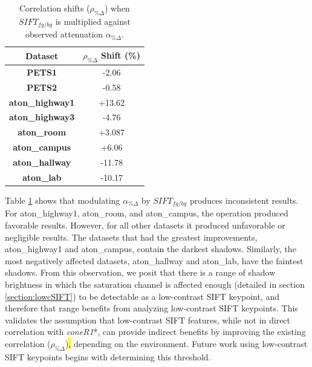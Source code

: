 \begin{table}
\centering
\begin{tabular}{ |c|c| }
	\hline
	\textbf{Dataset} & $\rho_{\%\Delta}$ Shift (\%)\\
	\hline
	\hline
	\textbf{PETS1} &  -2.06 \\
	\hline
	\textbf{PETS2} & -0.58 \\
	\hline
	\textbf{aton\_highway1} &  +13.62 \\
	\hline
	\textbf{aton\_highway3} & -4.76  \\
	\hline
	\textbf{aton\_room} & +3.087 \\
	\hline
	\textbf{aton\_campus} & +6.06 \\
	\hline
	\textbf{aton\_hallway} & -11.78 \\
	\hline
	\textbf{aton\_lab} & -10.17 \\
	\hline
\end{tabular}
\caption{Correlation shifts ($\rho_{\%\Delta}$) when $SIFT_{fg/bg}$ is multiplied against observed attenuation $\alpha_{\%\Delta}$.}
\label{table:corr_diff_sift}
\end{table}

Table \ref{table:corr_diff_sift} shows that modulating $\alpha_{\%\Delta}$ by $SIFT_{fg/bg}$ produces inconsistent results. For aton\_highway1, aton\_room, and aton\_campus, the operation produced favorable results. However, for all other datasets it produced unfavorable or negligible results. The datasets that had the greatest improvements, aton\_highway1 and aton\_campus, contain the darkest shadows. Similarly, the most negatively affected datasets, aton\_hallway and aton\_lab, have the faintest shadows. From this observation, we posit that there is a range of shadow brightness in which the saturation channel is affected enough (detailed in section \ref{section:lowcSIFT}) to be detectable as a low-contrast SIFT keypoint, and therefore that range benefits from analyzing low-contrast SIFT keypoints. This validates the assumption that low-contrast SIFT features, while not in direct correlation with \textit{coneR1}*, can provide indirect benefits by improving the existing correlation ($\rho_{\%\Delta}$)\hl{,} depending on the environment. Future work using low-contrast SIFT keypoints begins with determining this threshold.


